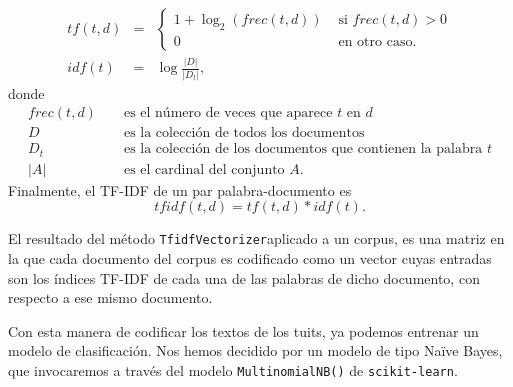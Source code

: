 $$\begin{array}{rcl}
tf(t,d) &=& \left\{\begin{array}{ll}
1+\log_2(frec(t,d)) &\mbox{ si }frec(t,d)>0\\
0&\mbox{ en otro caso.}
\end{array}\right.\\
idf(t) &=& \log\frac{|D|}{|D_t|},
\end{array}
$$
donde
\begin{eqnarray*}
frec(t,d) &&\mbox{ es el número de veces que aparece $t$ en $d$}\\
D&& \mbox{ es la colección de todos los documentos }\\
D_t&& \mbox{ es la colección de los documentos que contienen la palabra }t\\
|A| && \mbox{ es el cardinal del conjunto }A.
\end{eqnarray*}
Finalmente, el TF-IDF de un par palabra-documento es
$$tfidf(t,d)=tf(t,d)*idf(t).$$

El resultado del método {\tt TfidfVectorizer}aplicado a un corpus, 
es una matriz en la que cada documento
del corpus es codificado como un vector cuyas entradas son los índices TF-IDF de cada
una de las palabras de dicho documento, con respecto a ese mismo documento.

Con esta manera de codificar los textos de los tuits, ya podemos entrenar un modelo 
de clasificación. Nos hemos decidido por un modelo de tipo Naïve Bayes, que 
invocaremos a través del modelo {\tt MultinomialNB()} de {\tt  scikit-learn}.

